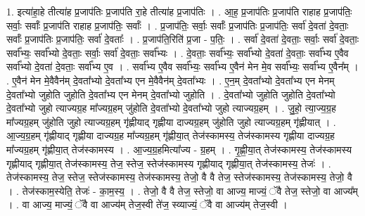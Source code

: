 \documentclass[17pt]{extarticle}
\begin{document}
1. इत्या॑हा॒हे तीत्या॑ह प्र॒जाप॑तिः प्र॒जाप॑ति रा॒हे तीत्या॑ह प्र॒जाप॑तिः । . आ॒ह॒ प्र॒जाप॑तिः प्र॒जाप॑ति राहाह प्र॒जाप॑तिः॒ सर्वाः॒ सर्वाः᳚ प्र॒जाप॑ति राहाह प्र॒जाप॑तिः॒ सर्वाः᳚ । . प्र॒जाप॑तिः॒ सर्वाः॒ सर्वाः᳚ प्र॒जाप॑तिः प्र॒जाप॑तिः॒ सर्वा॑ दे॒वता॑ दे॒वताः॒ सर्वाः᳚ प्र॒जाप॑तिः प्र॒जाप॑तिः॒ सर्वा॑ दे॒वताः᳚ । . प्र॒जाप॑ति॒रिति॑ प्र॒जा - प॒तिः॒ । . सर्वा॑ दे॒वता॑ दे॒वताः॒ सर्वाः॒ सर्वा॑ दे॒वताः॒ सर्वा᳚भ्यः॒ सर्वा᳚भ्यो दे॒वताः॒ सर्वाः॒ सर्वा॑ दे॒वताः॒ सर्वा᳚भ्यः । . दे॒वताः॒ सर्वा᳚भ्यः॒ सर्वा᳚भ्यो दे॒वता॑ दे॒वताः॒ सर्वा᳚भ्य ए॒वैव सर्वा᳚भ्यो दे॒वता॑ दे॒वताः॒ सर्वा᳚भ्य ए॒व । . सर्वा᳚भ्य ए॒वैव सर्वा᳚भ्यः॒ सर्वा᳚भ्य ए॒वैन॑ मेन मे॒व सर्वा᳚भ्यः॒ सर्वा᳚भ्य ए॒वैन᳚म् । . ए॒वैन॑ मेन मे॒वैवैन॑म् दे॒वता᳚भ्यो दे॒वता᳚भ्य एन मे॒वैवैन॑म् दे॒वता᳚भ्यः । . ए॒न॒म् दे॒वता᳚भ्यो दे॒वता᳚भ्य एन मेनम् दे॒वता᳚भ्यो जुहोति जुहोति दे॒वता᳚भ्य एन मेनम् दे॒वता᳚भ्यो जुहोति । . दे॒वता᳚भ्यो जुहोति जुहोति दे॒वता᳚भ्यो दे॒वता᳚भ्यो जुहो त्याज्यग्र॒ह मा᳚ज्यग्र॒हम् जु॑होति दे॒वता᳚भ्यो दे॒वता᳚भ्यो जुहो त्याज्यग्र॒हम् । . जु॒हो॒ त्या॒ज्य॒ग्र॒ह मा᳚ज्यग्र॒हम् जु॑होति जुहो त्याज्यग्र॒हम् गृ॑ह्णीयाद् गृह्णीया दाज्यग्र॒हम् जु॑होति जुहो त्याज्यग्र॒हम् गृ॑ह्णीयात् । . आ॒ज्य॒ग्र॒हम् गृ॑ह्णीयाद् गृह्णीया दाज्यग्र॒ह मा᳚ज्यग्र॒हम् गृ॑ह्णीया॒त् तेज॑स्कामस्य॒ तेज॑स्कामस्य गृह्णीया दाज्यग्र॒ह मा᳚ज्यग्र॒हम् गृ॑ह्णीया॒त् तेज॑स्कामस्य । . आ॒ज्य॒ग्र॒हमित्या᳚ज्य - ग्र॒हम् । . गृ॒ह्णी॒या॒त् तेज॑स्कामस्य॒ तेज॑स्कामस्य गृह्णीयाद् गृह्णीया॒त् तेज॑स्कामस्य॒ तेज॒ स्तेज॒ स्तेज॑स्कामस्य गृह्णीयाद् गृह्णीया॒त् तेज॑स्कामस्य॒ तेजः॑ । . तेज॑स्कामस्य॒ तेज॒ स्तेज॒ स्तेज॑स्कामस्य॒ तेज॑स्कामस्य॒ तेजो॒ वै वै तेज॒ स्तेज॑स्कामस्य॒ तेज॑स्कामस्य॒ तेजो॒ वै । . तेज॑स्काम॒स्येति॒ तेजः॑ - का॒म॒स्य॒ । . तेजो॒ वै वै तेज॒ स्तेजो॒ वा आज्य॒ माज्यं॒ ॅवै तेज॒ स्तेजो॒ वा आज्य᳚म् । . वा आज्य॒ माज्यं॒ ॅवै वा आज्य॑म् तेज॒स्वी ते॑ज॒ स्व्याज्यं॒ ॅवै वा आज्य॑म् तेज॒स्वी । \newline
\end{document}
